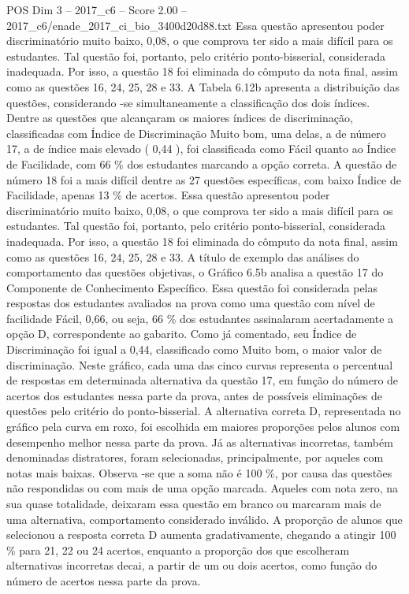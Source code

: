 \begin{textsample}{POS Dim 3 – 2017\_c6 – Score 2.00 – 2017\_c6/enade\_2017\_ci\_bio\_3400d20d88.txt}
Essa questão apresentou poder discriminatório muito baixo, 0,08, o que comprova ter sido a mais difícil para os estudantes.
Tal questão foi, portanto, pelo critério ponto-bisserial, considerada inadequada.
Por isso, a questão 18 foi eliminada do cômputo da nota final, assim como as questões 16, 24, 25, 28 e 33.
A Tabela 6.12b apresenta a distribuição das questões, considerando -se simultaneamente a classificação dos dois índices.
Dentre as questões que alcançaram os maiores índices de discriminação, classificadas com Índice de Discriminação Muito bom, uma delas, a de número 17, a de índice mais elevado ( 0,44 ), foi classificada como Fácil quanto ao Índice de Facilidade, com 66 \% dos estudantes marcando a opção correta.
A questão de número 18 foi a mais difícil dentre as 27 questões específicas, com baixo Índice de Facilidade, apenas 13 \% de acertos.
Essa questão apresentou poder discriminatório muito baixo, 0,08, o que comprova ter sido a mais difícil para os estudantes.
Tal questão foi, portanto, pelo critério ponto-bisserial, considerada inadequada.
Por isso, a questão 18 foi eliminada do cômputo da nota final, assim como as questões 16, 24, 25, 28 e 33.
A título de exemplo das análises do comportamento das questões objetivas, o Gráfico 6.5b analisa a questão 17 do Componente de Conhecimento Específico.
Essa questão foi considerada pelas respostas dos estudantes avaliados na prova como uma questão com nível de facilidade Fácil, 0,66, ou seja, 66 \% dos estudantes assinalaram acertadamente a opção D, correspondente ao gabarito.
Como já comentado, seu Índice de Discriminação foi igual a 0,44, classificado como Muito bom, o maior valor de discriminação.
Neste gráfico, cada uma das cinco curvas representa o percentual de respostas em determinada alternativa da questão 17, em função do número de acertos dos estudantes nessa parte da prova, antes de possíveis eliminações de questões pelo critério do ponto-bisserial.
A alternativa correta D, representada no gráfico pela curva em roxo, foi escolhida em maiores proporções pelos alunos com desempenho melhor nessa parte da prova.
Já as alternativas incorretas, também denominadas distratores, foram selecionadas, principalmente, por aqueles com notas mais baixas.
Observa -se que a soma não é 100 \%, por causa das questões não respondidas ou com mais de uma opção marcada.
Aqueles com nota zero, na sua quase totalidade, deixaram essa questão em branco ou marcaram mais de uma alternativa, comportamento considerado inválido.
A proporção de alunos que selecionou a resposta correta D aumenta gradativamente, chegando a atingir 100 \% para 21, 22 ou 24 acertos, enquanto a proporção dos que escolheram alternativas incorretas decai, a partir de um ou dois acertos, como função do número de acertos nessa parte da prova.

\end{textsample}
